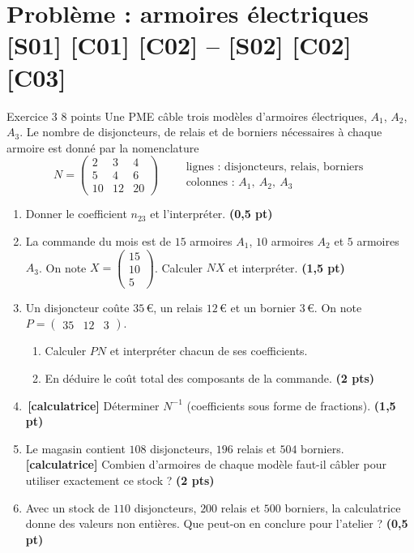 \documentclass[a4paper,11pt]{article}
\newcommand{\pts}[1]{\hfill{\color{uimmred}\small\textbf{(#1)}}}
\newcommand{\M}[1]{\begin{pmatrix}#1\end{pmatrix}}
\newcommand{\calc}{\,{\color{uimmred}\small\textbf{[calculatrice]}}}
\begin{document}
\section{Problème : armoires électriques \hfill {\normalsize\color{uimmred}[S01] [C01] [C02] -- [S02] [C02] [C03]}}
\begin{exo}{Exercice 3 \hfill 8 points}
\label{ev:3}
Une PME câble trois modèles d'armoires électriques, $A_1$, $A_2$, $A_3$. Le nombre de disjoncteurs, de relais et de borniers nécessaires à chaque armoire est donné par la nomenclature
\[
N = \M{2 & 3 & 4\\ 5 & 4 & 6\\ 10 & 12 & 20}
\qquad
\begin{array}{l}\text{lignes : disjoncteurs, relais, borniers}\\ \text{colonnes : } A_1,\ A_2,\ A_3\end{array}
\]
\begin{enumerate}
  \item Donner le coefficient $n_{23}$ et l'interpréter. \pts{0,5 pt}
  \item La commande du mois est de $15$ armoires $A_1$, $10$ armoires $A_2$ et $5$ armoires $A_3$. On note $X = \M{15\\10\\5}$. Calculer $NX$ et interpréter. \pts{1,5 pt}
  \item Un disjoncteur coûte $35$\,€, un relais $12$\,€ et un bornier $3$\,€. On note $P = \M{35 & 12 & 3}$.
  \begin{enumerate}
    \item Calculer $PN$ et interpréter chacun de ses coefficients.
    \item En déduire le coût total des composants de la commande. \pts{2 pts}
  \end{enumerate}
  \item \calc{} Déterminer $N^{-1}$ (coefficients sous forme de fractions). \pts{1,5 pt}
  \item Le magasin contient $108$ disjoncteurs, $196$ relais et $504$ borniers. \calc{} Combien d'armoires de chaque modèle faut-il câbler pour utiliser exactement ce stock ? \pts{2 pts}
  \item Avec un stock de $110$ disjoncteurs, $200$ relais et $500$ borniers, la calculatrice donne des valeurs non entières. Que peut-on en conclure pour l'atelier ? \pts{0,5 pt}
\end{enumerate}
\end{exo}
\end{document}
